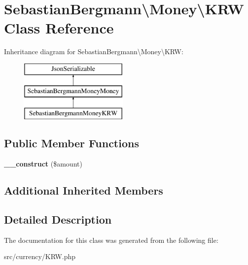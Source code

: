 \hypertarget{classSebastianBergmann_1_1Money_1_1KRW}{}\section{Sebastian\+Bergmann\textbackslash{}Money\textbackslash{}K\+R\+W Class Reference}
\label{classSebastianBergmann_1_1Money_1_1KRW}
Inheritance diagram for Sebastian\+Bergmann\textbackslash{}Money\textbackslash{}K\+R\+W\+:\begin{figure}[H]
\begin{center}
\leavevmode
\includegraphics[height=3.000000cm]{classSebastianBergmann_1_1Money_1_1KRW}
\end{center}
\end{figure}
\subsection*{Public Member Functions}
\begin{DoxyCompactItemize}
\item 
\hypertarget{classSebastianBergmann_1_1Money_1_1KRW_a602a28438bb8f7c3d83971ff0bb49807}{}{\bfseries \+\_\+\+\_\+construct} (\$amount)\label{classSebastianBergmann_1_1Money_1_1KRW_a602a28438bb8f7c3d83971ff0bb49807}

\end{DoxyCompactItemize}
\subsection*{Additional Inherited Members}


\subsection{Detailed Description}


The documentation for this class was generated from the following file\+:\begin{DoxyCompactItemize}
\item 
src/currency/K\+R\+W.\+php\end{DoxyCompactItemize}
